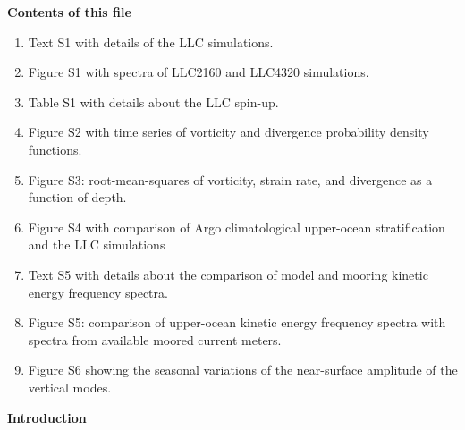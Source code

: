 \documentclass[draft,grl]{agutexSI}
\begin{document}
%
%

%

\begin{article}

%
%



\noindent\textbf{Contents of this file}
\begin{enumerate}
\item Text S1 with details of the LLC simulations.
\item Figure S1 with spectra of LLC2160 and LLC4320 simulations.
\item Table S1 with details about the LLC spin-up.
\item Figure S2 with time series of vorticity and divergence probability density
      functions.
\item Figure S3: root-mean-squares of vorticity, strain rate, and divergence
      as a function of depth.
\item Figure S4 with comparison of Argo climatological upper-ocean stratification
      and the LLC simulations
\item Text S5 with details about the comparison of model and mooring kinetic energy
            frequency spectra.
\item Figure S5: comparison of upper-ocean kinetic energy
      frequency spectra with spectra from available moored current meters.
\item Figure S6 showing the seasonal variations of the near-surface amplitude
      of the vertical modes.
\end{enumerate}


\noindent\textbf{Introduction}


\end{article}
\end{document}
